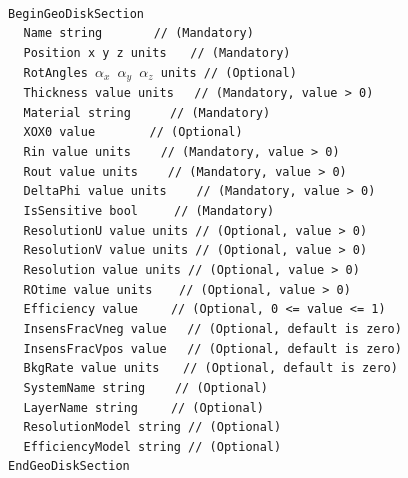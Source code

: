 ~\\
\noindent
{\tt BeginGeoDiskSection} \\
$~~~~~${\tt Name             string                   $~~~~~~~~~~~~$   // (Mandatory)} \\
$~~~~~${\tt Position         x  y  z units                     $~~~$   // (Mandatory)} \\
$~~~~~${\tt RotAngles        $\alpha_x$  $\alpha_y$  $\alpha_z$ units  // (Optional)}  \\
$~~~~~${\tt Thickness        value  units                       $~~$   // (Mandatory, value > 0)} \\
$~~~~~${\tt Material         string                       $~~~~~~~~$   // (Mandatory)} \\
$~~~~~${\tt XOX0             value                   $~~~~~~~~~~~~~$   // (Optional)}  \\
$~~~~~${\tt Rin              value units                     $~~~~~$   // (Mandatory, value > 0)} \\
$~~~~~${\tt Rout             value units                     $~~~~~$   // (Mandatory, value > 0)} \\
$~~~~~${\tt DeltaPhi         value units                     $~~~~~$   // (Mandatory, value > 0)} \\
$~~~~~${\tt IsSensitive      bool                          $~~~~~~~$   // (Mandatory)} \\
$~~~~~${\tt ResolutionU      value units                               // (Optional, value > 0)} \\
$~~~~~${\tt ResolutionV      value units                               // (Optional, value > 0)} \\
$~~~~~${\tt Resolution       value units                               // (Optional, value > 0)} \\
$~~~~~${\tt ROtime           value units                      $~~~~$   // (Optional, value > 0)} \\
$~~~~~${\tt Efficiency       value                          $~~~~~~$   // (Optional, 0 <= value <= 1)} \\
$~~~~~${\tt InsensFracVneg   value                              $~~$   // (Optional, default is zero)} \\
$~~~~~${\tt InsensFracVpos   value                              $~~$   // (Optional, default is zero)} \\
$~~~~~${\tt BkgRate          value units                       $~~~$   // (Optional, default is zero)} \\
$~~~~~${\tt SystemName       string                          $~~~~~$   // (Optional)} \\
$~~~~~${\tt LayerName        string                         $~~~~~~$   // (Optional)} \\
$~~~~~${\tt ResolutionModel  string                                    // (Optional)} \\
$~~~~~${\tt EfficiencyModel  string                                    // (Optional)} \\
{\tt EndGeoDiskSection}

